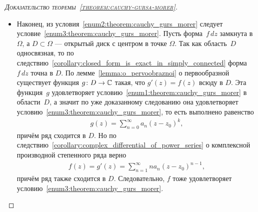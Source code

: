 \documentclass[../complex-analysis.tex]{subfiles}
\begin{document}
\begin{proof}[\normalfont\textsc{Доказательство теоремы~\ref{theorem:cauchy-gursa-morer}}]
\begin{itemize}
  \item Наконец, из условия~\ref{enum2:theorem:cauchy_gurs_morer} следует условие~\ref{enum3:theorem:cauchy_gurs_morer}. Пусть форма~$ f\,dz $ замкнута в $ \Omega $, а $ D \subset \Omega $ --- открытый диск с центром в точке $ \Omega $. Так как область~$ D $ односвязная, то по следствию~\ref{corollary:closed_form_is_exact_in_simply_connected} форма~$ f\,dz $ точна в $ D $. По лемме~\ref{lemma:o_pervoobraznoi} о первообразной существует функция $ g\colon D\to\mathbb{C} $ такая, что $ g'(z) = f(z) $ всюду в $ D $. Эта функция~$ g $ удовлетворяет условию~\ref{enum1:theorem:cauchy_gurs_morer} в области~$ D $, а значит по уже доказанному следованию она удовлетворяет условию~\ref{enum3:theorem:cauchy_gurs_morer}, то есть выполнено равенство
   \begin{align*}
    g(z) = \sum_{n=0}^{\infty} a_n(z-z_0)^{k},
   \end{align*} причём ряд сходится в $ D $. Но по следствию~\ref{corollary:complex_differential_of_power_series} о комплексной производной степенного ряда верно
   \begin{align*}
    f(z) = g'(z) = \sum_{n=1}^{\infty}na_n(z-z_0)^{n-1},
   \end{align*} причём ряд также сходится в $ D $. Следовательно, $ f $ тоже удовлетворяет условию~\ref{enum3:theorem:cauchy_gurs_morer}.
 \end{itemize}
\end{proof}
\end{document}
